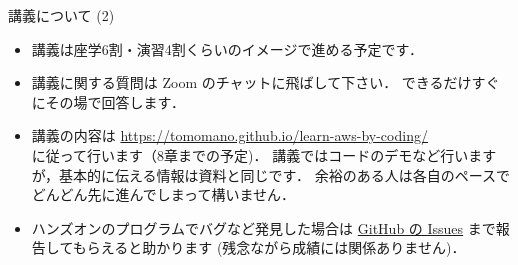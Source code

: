 \documentclass[unicode,11pt]{beamer}
\begin{document}
\begin{frame}{講義について (2)}
\begin{itemize}
    \item 講義は座学6割・演習4割くらいのイメージで進める予定です．
    \item 講義に関する質問は Zoom のチャットに飛ばして下さい．
    できるだけすぐにその場で回答します．
    \item 講義の内容は
    \url{https://tomomano.github.io/learn-aws-by-coding/}\\
    に従って行います（8章までの予定)．
    講義ではコードのデモなど行いますが，基本的に伝える情報は資料と同じです．
    余裕のある人は各自のペースでどんどん先に進んでしまって構いません．
    \item ハンズオンのプログラムでバグなど発見した場合は
    \href{https://github.com/tomomano/learn-aws-by-coding/issues}{GitHub の Issues}
    まで報告してもらえると助かります (残念ながら成績には関係ありません)．
\end{itemize}

\end{frame}
\end{document}

